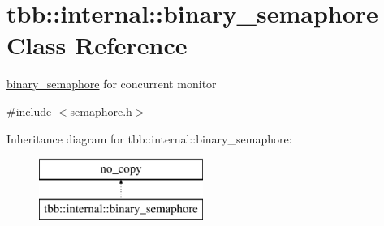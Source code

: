 \hypertarget{classtbb_1_1internal_1_1binary__semaphore}{}\section{tbb\+:\+:internal\+:\+:binary\+\_\+semaphore Class Reference}
\label{classtbb_1_1internal_1_1binary__semaphore}


\hyperlink{classtbb_1_1internal_1_1binary__semaphore}{binary\+\_\+semaphore} for concurrent monitor  




{\ttfamily \#include $<$semaphore.\+h$>$}

Inheritance diagram for tbb\+:\+:internal\+:\+:binary\+\_\+semaphore\+:\begin{figure}[H]
\begin{center}
\leavevmode
\includegraphics[height=2.000000cm]{classtbb_1_1internal_1_1binary__semaphore}
\end{center}
\end{figure}
